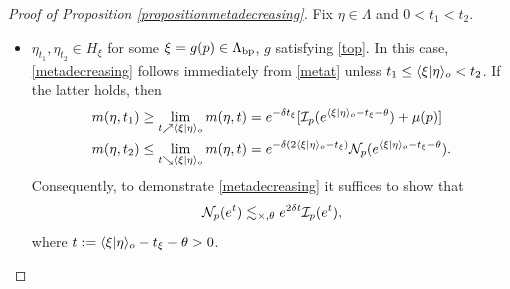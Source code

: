 \begin{proof}[Proof of Proposition \ref{propositionmetadecreasing}]
Fix $\eta\in\Lambda$ and $0 < t_1 < t_2$.
\begin{itemize}
\item[Case 1:] $\eta_{t_1},\eta_{t_2}\in H_\xi$ for some $\xi = g(p) \in \Lambda_{\mathrm{bp}}$, $g$ satisfying \eqref{top}. In this case, \eqref{metadecreasing} follows immediately from \eqref{metat} unless $t_1 \leq \langle \xi|\eta\rangle_o < t_2$. If the latter holds, then
\begin{align*}
m(\eta,t_1) &\geq \lim_{t\nearrow\langle \xi|\eta\rangle_o}m(\eta,t) = e^{-\delta t_\xi} [\mathcal I_p(e^{\langle \xi|\eta\rangle_o - t_\xi - \theta}) + \mu(p)]\\
m(\eta,t_2) &\leq \lim_{t\searrow\langle \xi|\eta\rangle_o}m(\eta,t) = e^{-\delta(2\langle \xi|\eta\rangle_o - t_\xi)} \mathcal N_p(e^{\langle \xi|\eta\rangle_o - t_\xi - \theta}).
\end{align*}
Consequently, to demonstrate \eqref{metadecreasing} it suffices to show that
\begin{equation}
\label{ETSmetadecreasing}
\mathcal N_p(e^t) \lesssim_{\times,\theta} e^{2\delta t}\mathcal I_p(e^t),
\end{equation}
where $t := \langle \xi|\eta\rangle_o - t_\xi - \theta > 0$.


\end{itemize}
\end{proof}
